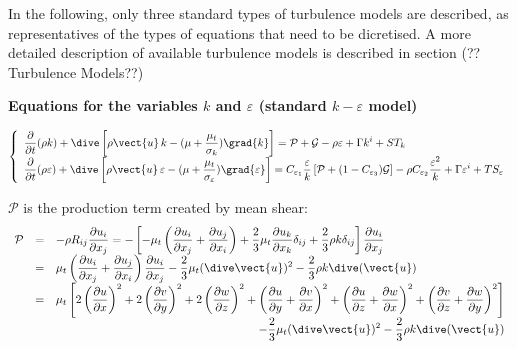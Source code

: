 \hspace*{1cm}

In the following, only three standard types of turbulence models are
described, as representatives of the types of equations that need to be
dicretised. A more detailed description of available turbulence models is
described in section (?? Turbulence Models??)

\clearpage \textbf{Equations for the variables $k$ and $\varepsilon$
(standard $k-\varepsilon$ model)}

\begin{equation}
\left\{
\begin{array}{l}
\displaystyle\frac{\partial }{\partial t}(\rho k)+\dive\left[ \rho \vect{u}%
\,k-(\mu +\frac{\mu _{t}}{\sigma _{k}})\grad{k}\right] =\mathcal{P}+\mathcal{%
G}-\rho \varepsilon +\Gamma k^{i}+ST_{k} \\
\displaystyle\frac{\partial }{\partial t}(\rho \varepsilon )+\dive\left[
\rho \vect{u}\,\varepsilon -(\mu +\frac{\mu _{t}}{\sigma _{\varepsilon }})%
\grad{\varepsilon}\right] =C_{\varepsilon _{1}}\frac{\varepsilon }{k}\left[
\mathcal{P}+(1-C_{\varepsilon _{3}})\mathcal{G}\right] -\rho C_{\varepsilon
_{2}}\frac{\varepsilon ^{2}}{k}+\Gamma \varepsilon ^{i}+TS_{\varepsilon }%
\end{array}%
\right.
\end{equation}

$\mathcal{P}$ is the production term created by mean shear:
\[
\begin{array}{rcl}
\mathcal{P} & = & \displaystyle -\rho R_{ij}\frac{\partial u_i}{\partial x_j}
= -\left[-\mu_t \left(\frac{\partial u_i}{\partial x_j} + \frac{\partial u_j%
}{\partial x_i}\right) +\frac{2}{3}\mu_t\frac{\partial u_k}{\partial x_k}%
\delta_{ij} +\frac{2}{3}\rho k\delta_{ij}\right] \frac{\partial u_i}{%
\partial x_j} \\
& = & \displaystyle \mu_t \left(\frac{\partial u_i}{\partial x_j} + \frac{%
\partial u_j}{\partial x_i}\right)\frac{\partial u_i}{\partial x_j} -\frac{2%
}{3}\mu_t(\dive\vect{u})^2-\frac{2}{3}\rho k \dive(\vect{u}) \\
& = & \displaystyle \mu_t \left[ 2\left(\frac{\partial u}{\partial x}%
\right)^2+ 2\left(\frac{\partial v}{\partial y}\right)^2+ 2\left(\frac{%
\partial w}{\partial z}\right)^2+ \left(\frac{\partial u}{\partial y}+\frac{%
\partial v}{\partial x}\right)^2+ \left(\frac{\partial u}{\partial z}+\frac{%
\partial w}{\partial x}\right)^2+ \left(\frac{\partial v}{\partial z}+\frac{%
\partial w}{\partial y}\right)^2 \right] \\
\multicolumn{3}{r}{\displaystyle -\frac{2}{3}\mu_t(\dive\vect{u})^2-\frac{2}{%
3}\rho k \dive(\vect{u})}%
\end{array}
\]

